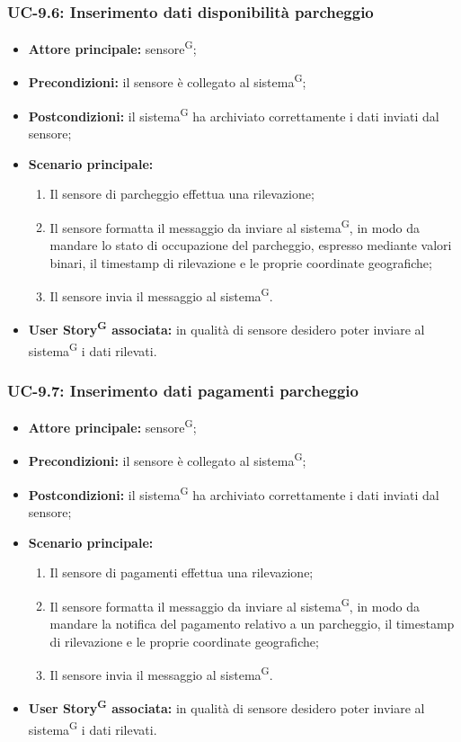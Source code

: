 \documentclass[8pt]{article}
\newcommand{\glossterm}[1]{#1\textsuperscript{G}} %
\begin{document}
\subsubsection*{UC-9.6: Inserimento dati disponibilità parcheggio}
\begin{itemize}
    \item \textbf{Attore principale:} \glossterm{sensore};
    \item \textbf{Precondizioni:} il sensore è collegato al \glossterm{sistema};
    \item \textbf{Postcondizioni:} il \glossterm{sistema} ha archiviato correttamente i dati inviati dal sensore;
    \item \textbf{Scenario principale:}
        \begin{enumerate}
        \item Il sensore di parcheggio effettua una rilevazione;
        \item Il sensore formatta il messaggio da inviare al \glossterm{sistema}, in modo da mandare lo stato di occupazione del parcheggio, espresso mediante valori binari, il timestamp di rilevazione e le proprie coordinate geografiche;
        \item Il sensore invia il messaggio al \glossterm{sistema}.
        \end{enumerate}
    \item \textbf{\glossterm{User Story} associata:} in qualità di sensore desidero poter inviare al \glossterm{sistema} i dati rilevati.
\end{itemize}
\subsubsection*{UC-9.7: Inserimento dati pagamenti parcheggio}
\begin{itemize}
    \item \textbf{Attore principale:} \glossterm{sensore};
    \item \textbf{Precondizioni:} il sensore è collegato al \glossterm{sistema};
    \item \textbf{Postcondizioni:} il \glossterm{sistema} ha archiviato correttamente i dati inviati dal sensore;
    \item \textbf{Scenario principale:}
        \begin{enumerate}
        \item Il sensore di pagamenti effettua una rilevazione;
        \item Il sensore formatta il messaggio da inviare al \glossterm{sistema}, in modo da mandare la notifica del pagamento relativo a un parcheggio, il timestamp di rilevazione e le proprie coordinate geografiche;
        \item Il sensore invia il messaggio al \glossterm{sistema}.
        \end{enumerate}
    \item \textbf{\glossterm{User Story} associata:} in qualità di sensore desidero poter inviare al \glossterm{sistema} i dati rilevati.
\end{itemize}
\end{document}
